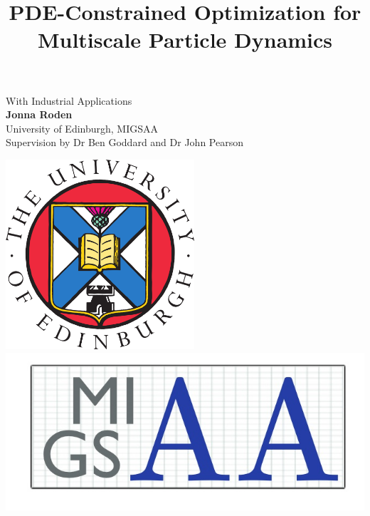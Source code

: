 \documentclass[a0,portrait]{a0poster}
\begin{document}
\thispagestyle{empty}
\vspace{-5cm}
\title{\veryHuge \color{NavyBlue} \textbf{PDE-Constrained Optimization for Multiscale Particle Dynamics} \color{Black}} %
\author{}
\date{}
\maketitle
\vspace{-4cm}
\begin{minipage}[b]{0.65\linewidth}
\Huge{With Industrial Applications}\\[1cm] %
\huge \textbf{Jonna Roden}\\[0.5cm] %
\huge University of Edinburgh, MIGSAA\\[0.4cm] %
\Large {Supervision by Dr Ben Goddard and Dr John Pearson} \\
\end{minipage}
\begin{minipage}[b]{0.35\linewidth}
	\vspace{-7cm}
\includegraphics[width=7cm]{EdinburghUni.png} \ \ \ \ \ \ \ \ \ \ 
\includegraphics[width=15cm]{MIGSAA.jpg}\\
\vspace{1cm}
\end{minipage}
\end{document}
